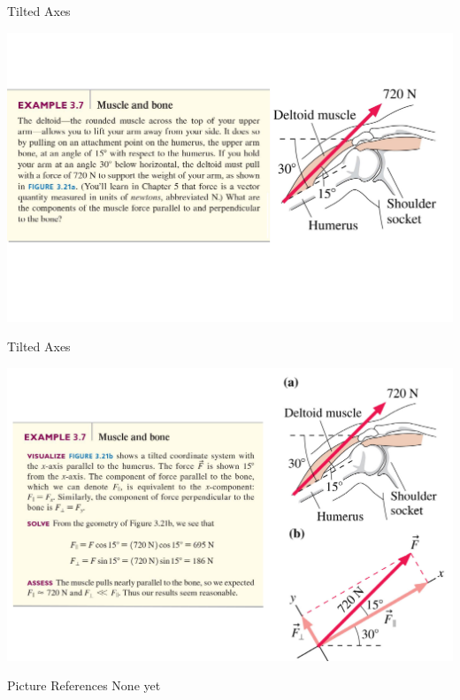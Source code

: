 \documentclass{beamer}
\begin{document}
\begin{frame}{Tilted Axes}
\begin{center}
   \includegraphics[width=\textwidth]{../figures/Ex3_7-1.png}
\end{center}
\end{frame}

\begin{frame}{Tilted Axes}
\begin{center}
   \includegraphics[width=\textwidth]{../figures/Ex3_7-2.png}
\end{center}
\end{frame}

\begin{frame}{Picture References}
\tiny
None yet
\end{frame}
\end{document}
